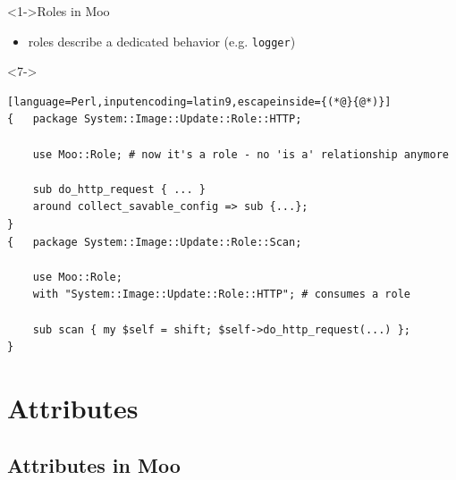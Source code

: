 \documentclass[ngerman,xcolor={table,dvipsnames},smaller,compress,hyperref={bookmarks,colorlinks},handout]{beamer}%
\begin{document}
\begin{frame}[t,fragile]

\begin{block}<1->{Roles in Moo}
\begin{itemize}
\item roles describe a dedicated behavior (e.g. \texttt{logger})
\end{itemize}
\end{block}

\begin{block}<7->{}
\scriptsize
\begin{lstlisting}[language=Perl,inputencoding=latin9,escapeinside={(*@}{@*)}]
{   package System::Image::Update::Role::HTTP;

    use Moo::Role; # now it's a role - no 'is a' relationship anymore

    sub do_http_request { ... }
    around collect_savable_config => sub {...};
}
{   package System::Image::Update::Role::Scan;

    use Moo::Role;
    with "System::Image::Update::Role::HTTP"; # consumes a role

    sub scan { my $self = shift; $self->do_http_request(...) };
}
\end{lstlisting}
\end{block}

\end{frame}

\section{Attributes}

\subsection{Attributes in Moo}
\end{document}
